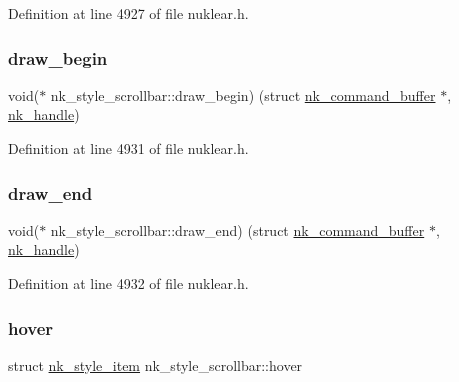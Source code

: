 Definition at line 4927 of file nuklear.\+h.

\mbox{\label{structnk__style__scrollbar_a71b634a194cacf873ba06c5010b7d154}} 
\subsubsection{\texorpdfstring{draw\+\_\+begin}{draw\_begin}}
{\footnotesize\ttfamily void($\ast$ nk\+\_\+style\+\_\+scrollbar\+::draw\+\_\+begin) (struct \mbox{\hyperlink{structnk__command__buffer}{nk\+\_\+command\+\_\+buffer}} $\ast$, \mbox{\hyperlink{unionnk__handle}{nk\+\_\+handle}})}



Definition at line 4931 of file nuklear.\+h.

\mbox{\label{structnk__style__scrollbar_aa89c7f391ccb04c1d2c1e6a1fc5434c9}} 
\subsubsection{\texorpdfstring{draw\+\_\+end}{draw\_end}}
{\footnotesize\ttfamily void($\ast$ nk\+\_\+style\+\_\+scrollbar\+::draw\+\_\+end) (struct \mbox{\hyperlink{structnk__command__buffer}{nk\+\_\+command\+\_\+buffer}} $\ast$, \mbox{\hyperlink{unionnk__handle}{nk\+\_\+handle}})}



Definition at line 4932 of file nuklear.\+h.

\mbox{\label{structnk__style__scrollbar_a5059aac4c32afa1a127f02f6b465b90c}} 
\subsubsection{\texorpdfstring{hover}{hover}}
{\footnotesize\ttfamily struct \mbox{\hyperlink{structnk__style__item}{nk\+\_\+style\+\_\+item}} nk\+\_\+style\+\_\+scrollbar\+::hover}



